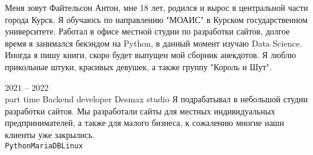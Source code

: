\documentclass[9pt]{developercv} %
\begin{document}
\vspace{0.5cm}



\begin{minipage}[t]{0.4\textwidth} %
	\vspace{-\baselineskip} %
  Меня зовут Файтельсон Антон, мне 18 лет, родился и вырос в центральной части города Курск. 
  Я обучаюсь по направлению "МОАИС" в Курском государственном университете. Работал в офисе 
  местной студии по разработки сайтов, долгое время я занимался бекэндом на Python, в данный 
  момент изучаю Data Science. Иногда я пишу книги, скоро будет выпущен мой сборник анекдотов. 
  Я люблю прикольные штуки, красивых девушек, а также группу "Король и Шут". 
\end{minipage}
\hfill %
\begin{minipage}[t]{0.5\textwidth} %
	\vspace{-\baselineskip} %
	\begin{barchart}{5.5}


	\end{barchart}
\end{minipage}

\begin{center}
\end{center}



\begin{entrylist}

	\entry
		{2021 -- 2022\\\footnotesize{part time}}
		{Backend developer}
		{Desmax studio}
		{
      Я подрабатывал в небольшой студии разработки сайтов.
      Мы разработали сайты для местных индивидуальных предпринимателей, 
      а также для малого бизнеса, к сожалению многие наши 
      клиенты уже закрылись.\\
    \texttt{Python}\slashsep\texttt{MariaDB}\slashsep\texttt{Linux}}
\end{entrylist}
\end{document}
